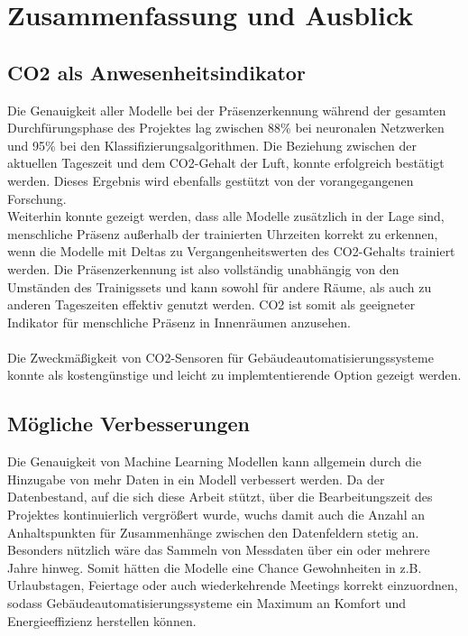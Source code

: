 \clearpage
\chapter{\textbf{Zusammenfassung und Ausblick}}\label{zusammenfassung}

\section{CO2 als Anwesenheitsindikator}
Die Genauigkeit aller Modelle bei der Präsenzerkennung während der gesamten Durchfürungsphase des Projektes 
lag zwischen 88\% bei neuronalen Netzwerken und 95\% bei den Klassifizierungsalgorithmen. 
Die Beziehung zwischen der aktuellen Tageszeit und dem CO2-Gehalt der Luft, konnte erfolgreich bestätigt 
werden. Dieses Ergebnis wird ebenfalls gestützt von der vorangegangenen Forschung.\\
Weiterhin konnte gezeigt werden, dass alle Modelle zusätzlich in der Lage sind, menschliche Präsenz außerhalb
der trainierten Uhrzeiten korrekt zu erkennen, wenn die Modelle mit Deltas zu Vergangenheitswerten des 
CO2-Gehalts trainiert werden. Die Präsenzerkennung ist also vollständig unabhängig von den Umständen des
Trainigssets und kann sowohl für andere Räume, als auch zu anderen Tageszeiten effektiv genutzt werden. 
CO2 ist somit als geeigneter Indikator für menschliche Präsenz in Innenräumen anzusehen.\\\\
Die Zweckmäßigkeit von CO2-Sensoren für Gebäudeautomatisierungssysteme konnte als kostengünstige und leicht 
zu implemtentierende Option gezeigt werden.

\section{Mögliche Verbesserungen}
Die Genauigkeit von Machine Learning Modellen kann allgemein durch die Hinzugabe von mehr Daten in ein Modell 
verbessert werden. 
Da der Datenbestand, auf die sich diese Arbeit stützt, über die Bearbeitungszeit des Projektes 
kontinuierlich vergrößert wurde, wuchs damit auch die Anzahl an Anhaltspunkten für Zusammenhänge zwischen den 
Datenfeldern stetig an. Besonders nützlich wäre das Sammeln von Messdaten über ein oder mehrere Jahre hinweg.
Somit hätten die Modelle eine Chance Gewohnheiten in z.B. Urlaubstagen, Feiertage oder auch wiederkehrende
Meetings korrekt einzuordnen, sodass Gebäudeautomatisierungssysteme ein Maximum an Komfort und Energieeffizienz
herstellen können.\\\\

